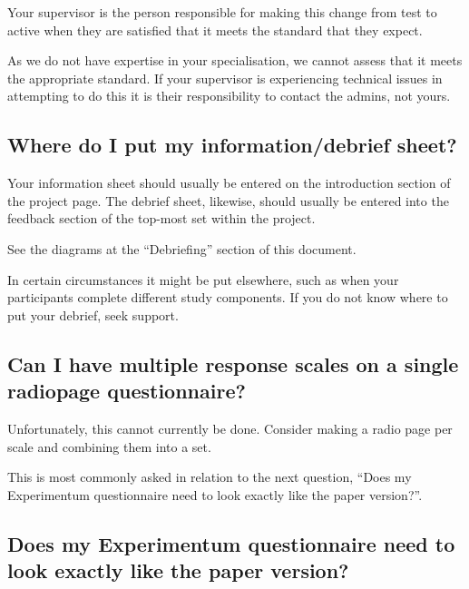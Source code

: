 \documentclass[]{book}
\begin{document}
Your supervisor is the person responsible for making this change from test to active when they are satisfied that it meets the standard that they expect.

As we do not have expertise in your specialisation, we cannot assess that it meets the appropriate standard. If your supervisor is experiencing technical issues in attempting to do this it is their responsibility to contact the admins, not yours.

\hypertarget{where-do-i-put-my-informationdebrief-sheet}{%
\subsection*{Where do I put my information/debrief sheet?}\label{where-do-i-put-my-informationdebrief-sheet}}

Your information sheet should usually be entered on the introduction section of the project page. The debrief sheet, likewise, should usually be entered into the feedback section of the top-most set within the project.

See the diagrams at the ``Debriefing'' section of this document.

In certain circumstances it might be put elsewhere, such as when your participants complete different study components. If you do not know where to put your debrief, seek support.

\hypertarget{can-i-have-multiple-response-scales-on-a-single-radiopage-questionnaire}{%
\subsection*{Can I have multiple response scales on a single radiopage questionnaire?}\label{can-i-have-multiple-response-scales-on-a-single-radiopage-questionnaire}}

Unfortunately, this cannot currently be done. Consider making a radio page per scale and combining them into a set.

This is most commonly asked in relation to the next question, ``Does my Experimentum questionnaire need to look exactly like the paper version?''.

\hypertarget{does-my-experimentum-questionnaire-need-to-look-exactly-like-the-paper-version}{%
\subsection*{Does my Experimentum questionnaire need to look exactly like the paper version?}\label{does-my-experimentum-questionnaire-need-to-look-exactly-like-the-paper-version}}
\end{document}
